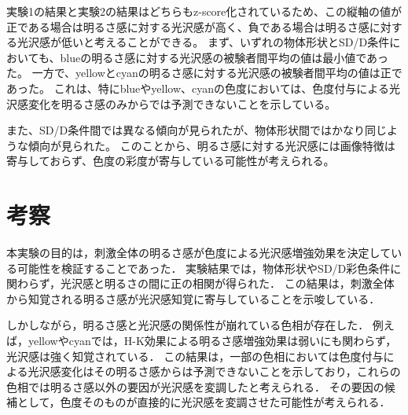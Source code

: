             実験1の結果と実験2の結果はどちらもz-score化されているため、この縦軸の値が正である場合は明るさ感に対する光沢感が高く、負である場合は明るさ感に対する光沢感が低いと考えることができる。
            まず、いずれの物体形状とSD/D条件においても、blueの明るさ感に対する光沢感の被験者間平均の値は最小値であった。
            一方で、yellowとcyanの明るさ感に対する光沢感の被験者間平均の値は正であった。
            これは、特にblueやyellow、cyanの色度においては、色度付与による光沢感変化を明るさ感のみからでは予測できないことを示している。
            
            また、SD/D条件間では異なる傾向が見られたが、物体形状間ではかなり同じような傾向が見られた。
            このことから、明るさ感に対する光沢感には画像特徴は寄与しておらず、色度の彩度が寄与している可能性が考えられる。

        \section{考察}
        
            本実験の目的は，刺激全体の明るさ感が色度による光沢感増強効果を決定している可能性を検証することであった．
            実験結果では，物体形状やSD/D彩色条件に関わらず，光沢感と明るさの間に正の相関が得られた．
            この結果は，刺激全体から知覚される明るさ感が光沢感知覚に寄与していることを示唆している．

            しかしながら，明るさ感と光沢感の関係性が崩れている色相が存在した．
            例えば，yellowやcyanでは，H-K効果による明るさ感増強効果は弱いにも関わらず，光沢感は強く知覚されている．
            この結果は，一部の色相においては色度付与による光沢感変化はその明るさ感からは予測できないことを示しており，これらの色相では明るさ感以外の要因が光沢感を変調したと考えられる．
            その要因の候補として，色度そのものが直接的に光沢感を変調させた可能性が考えられる．

    \newpage